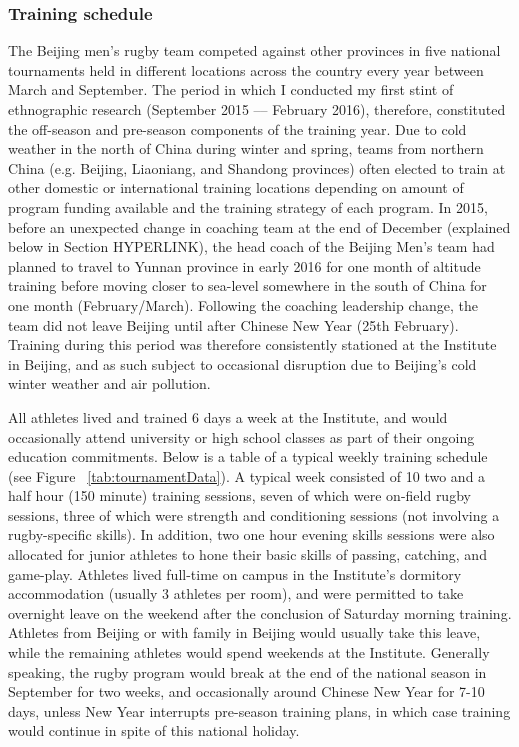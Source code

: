\begin{CJK}{UTF8}{gbsn}


\subsubsection{Training schedule}

 The Beijing men's rugby team competed against other provinces in five national tournaments held in different locations across the country   every year between March and September. The period in which I conducted my first stint of ethnographic research (September 2015 –-- February 2016), therefore, constituted the off-season and pre-season components of the training year.  Due to cold weather in the north of China during winter and spring, teams from northern China (e.g. Beijing, Liaoniang, and Shandong provinces) often elected to train   at other domestic or international training locations depending on amount of program funding available and the training strategy of each program.  In 2015, before an unexpected change in coaching team at the end of December (explained below in Section HYPERLINK), the head coach of the Beijing Men's team had planned to travel to Yunnan province in early 2016 for one month of altitude training before moving closer to sea-level somewhere in the south of China for one month (February/March).  Following the coaching leadership change, the team did not leave Beijing until after Chinese New Year (25th February). Training during this period was therefore consistently stationed at the Institute in Beijing, and as such subject to occasional disruption due to Beijing's cold winter weather and air pollution.

 All athletes lived and trained 6 days a week at the Institute, and would occasionally attend university or high school classes as part of their ongoing education commitments.  Below is a table of a typical weekly training schedule (see Figure ~\ref{tab:tournamentData}). A typical week consisted of 10 two and a half hour (150 minute) training sessions, seven of which were on-field rugby sessions, three of which were strength and conditioning sessions (not involving a rugby-specific skills).  In addition, two one hour evening skills sessions were also allocated for junior athletes to hone their basic skills of passing, catching, and game-play.  Athletes lived full-time on campus in the Institute's dormitory accommodation (usually 3 athletes per room), and were permitted to take overnight leave on the weekend after the conclusion of Saturday morning training.  Athletes from Beijing or with family in Beijing would usually take this leave, while the remaining athletes would spend weekends at the Institute.  Generally speaking, the rugby program would break at the end of the national season in September for two weeks, and occasionally around Chinese New Year for 7-10 days, unless New Year interrupts pre-season training plans, in which case training would continue in spite of this national holiday.


\end{CJK}
